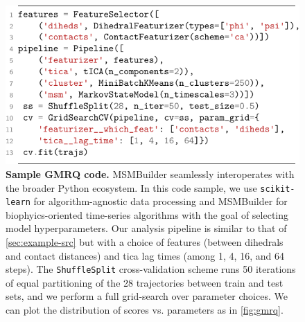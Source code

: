 \begin{figure}[htbp]
\centering
\includegraphics[width=\linewidth]{2-gmrq/code}
\caption{\textbf{Sample GMRQ code.}
    MSMBuilder seamlessly interoperates with the broader Python ecosystem.
    In this code sample, we use \texttt{scikit-learn} for
    algorithm-agnostic data processing and MSMBuilder for
    biophyics-oriented time-series algorithms with the goal of selecting
    model hyperparameters.  Our analysis pipeline is similar to that of
    \cref{sec:example-src} but with a choice of features (between dihedrals
    and contact distances) and tica lag times (among 1, 4, 16, and 64
    steps).  The \texttt{ShuffleSplit} cross-validation scheme runs 50
    iterations of equal partitioning of the 28 trajectories between train and test
    sets, and we perform a full grid-search over parameter choices.  We can
    plot the distribution of scores vs. parameters as in
    \cref{fig:gmrq}.
}
\label{fig:gmrq_code}
\end{figure}

